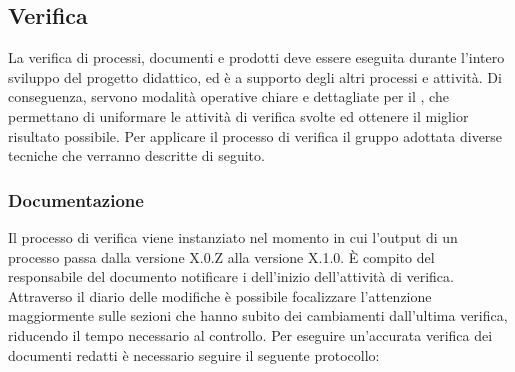 \documentclass[12pt,a4paper]{article}
\begin{document}

\subsection{Verifica}
La verifica di processi, documenti e prodotti deve essere eseguita durante l'intero sviluppo del progetto didattico, ed è a supporto degli altri processi e attività. Di conseguenza, servono modalità operative chiare e dettagliate per il \VR, che permettano di uniformare le attività di verifica svolte ed ottenere il miglior risultato possibile. Per applicare il processo di verifica il gruppo adottata diverse tecniche che verranno descritte di seguito.

\subsubsection{Documentazione}
Il processo di verifica viene instanziato nel momento in cui l'output di un processo passa dalla versione X.0.Z alla versione X.1.0. È compito del responsabile del documento notificare i \VRpl{} dell'inizio dell'attività di verifica. Attraverso il diario delle modifiche è possibile focalizzare l'attenzione maggiormente sulle sezioni che hanno subito dei cambiamenti dall'ultima verifica, riducendo il tempo necessario al controllo. Per eseguire un'accurata verifica dei documenti redatti è necessario seguire il seguente protocollo:
\end{document}
